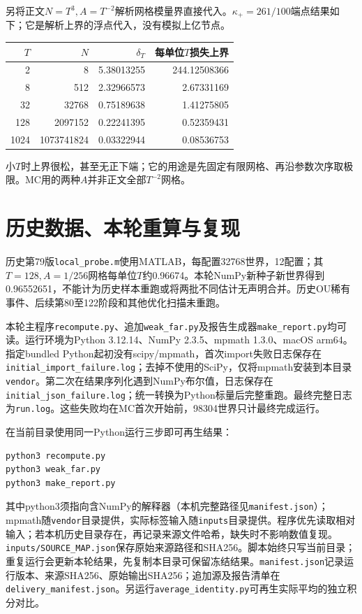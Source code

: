 \documentclass[UTF8,a4paper,11pt,fontset=none]{ctexart}
\begin{document}
另将正文\(N=T^3,A=T^{-2}\)解析网格模量界直接代入。\(\kappa_+=261/100\)端点结果如下；它是解析上界的浮点代入，没有模拟上亿节点。
\begin{center}\begin{tabular}{rrrr}\toprule
\(T\)&\(N\)&\(\delta_T\)&每单位\(T\)损失上界\\\midrule
2 & 8 & 5.38013255 & 244.12508366\\
8 & 512 & 2.32966573 & 2.67331169\\
32 & 32768 & 0.75189638 & 1.41275805\\
128 & 2097152 & 0.22241395 & 0.52359431\\
1024 & 1073741824 & 0.03322944 & 0.08536753\\
\bottomrule\end{tabular}\end{center}
小\(T\)时上界很松，甚至无正下端；它的用途是先固定有限网格、再沿参数次序取极限。MC用的两种\(A\)并非正文全部\(T^{-2}\)网格。

\section{历史数据、本轮重算与复现}
历史第79版\nolinkurl{local_probe.m}使用MATLAB，每配置32768世界，12配置；其\(T=128,A=1/256\)网格每单位\(T\)约0.96674。本轮NumPy新种子新世界得到0.96552651，不能计为历史样本重跑或将两批不同估计无声明合并。历史OU稀有事件、后续第80至122阶段和其他优化扫描未重跑。

本轮主程序\nolinkurl{recompute.py}、追加\nolinkurl{weak_far.py}及报告生成器\nolinkurl{make_report.py}均可读。运行环境为Python 3.12.14、NumPy 2.3.5、mpmath 1.3.0、macOS arm64。指定bundled Python起初没有scipy/mpmath，首次import失败日志保存在\nolinkurl{initial_import_failure.log}；去掉不使用的SciPy，仅将mpmath安装到本目录\nolinkurl{vendor}。第二次在结果序列化遇到NumPy布尔值，日志保存在\nolinkurl{initial_json_failure.log}；统一转换为Python标量后完整重跑。最终完整日志为\nolinkurl{run.log}。这些失败均在MC首次开始前，98304世界只计最终完成运行。

在当前目录使用同一Python运行三步即可再生结果：
\begin{verbatim}
python3 recompute.py
python3 weak_far.py
python3 make_report.py
\end{verbatim}
其中python3须指向含NumPy的解释器（本机完整路径见\nolinkurl{manifest.json}）；mpmath随\nolinkurl{vendor}目录提供，实际标签输入随\nolinkurl{inputs}目录提供。程序优先读取相对输入；若本机历史目录存在，再记录来源文件哈希，缺失时不影响数值复现。\nolinkurl{inputs/SOURCE_MAP.json}保存原始来源路径和SHA256。脚本始终只写当前目录；重复运行会更新本轮结果，先复制本目录可保留冻结结果。\nolinkurl{manifest.json}记录运行版本、来源SHA256、原始输出SHA256；追加源及报告清单在\nolinkurl{delivery_manifest.json}。另运行\nolinkurl{average_identity.py}可再生实际平均的独立积分对比。
\end{document}
